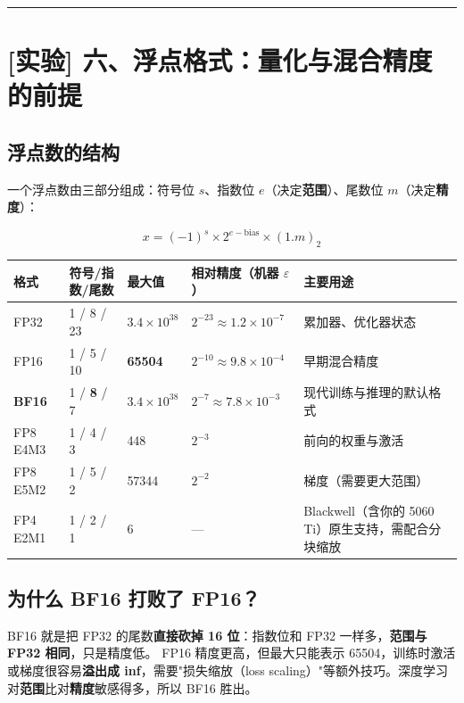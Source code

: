 \vspace{0.8em}\hrule\vspace{0.8em}

\section{[实验] 六、浮点格式：量化与混合精度的前提}

\subsection{浮点数的结构}

一个浮点数由三部分组成：符号位 $s$、指数位 $e$（决定\textbf{范围}）、尾数位 $m$（决定\textbf{精度}）：

\[
x = (-1)^s \times 2^{e - \text{bias}} \times (1.m)_2
\]

\begin{center}
\small
\begin{tabularx}{\textwidth}{l X X X X }
\toprule
\textbf{格式} & \textbf{符号/指数/尾数} & \textbf{最大值} & \textbf{相对精度（机器 $\varepsilon$）} & \textbf{主要用途} \\
\midrule
FP32 & 1 / 8 / 23 & $3.4 \times 10^{38}$ & $2^{-23} \approx 1.2 \times 10^{-7}$ & 累加器、优化器状态 \\
FP16 & 1 / 5 / 10 & \textbf{65504} & $2^{-10} \approx 9.8 \times 10^{-4}$ & 早期混合精度 \\
\textbf{BF16} & 1 / \textbf{8} / 7 & $3.4 \times 10^{38}$ & $2^{-7} \approx 7.8 \times 10^{-3}$ & 现代训练与推理的默认格式 \\
FP8 E4M3 & 1 / 4 / 3 & 448 & $2^{-3}$ & 前向的权重与激活 \\
FP8 E5M2 & 1 / 5 / 2 & 57344 & $2^{-2}$ & 梯度（需要更大范围） \\
FP4 E2M1 & 1 / 2 / 1 & 6 & — & Blackwell（含你的 5060 Ti）原生支持，需配合分块缩放 \\
\bottomrule
\end{tabularx}
\end{center}

\subsection{为什么 BF16 打败了 FP16？}

BF16 就是把 FP32 的尾数\textbf{直接砍掉 16 位}：指数位和 FP32 一样多，\textbf{范围与 FP32 相同}，只是精度低。
FP16 精度更高，但最大只能表示 65504，训练时激活或梯度很容易\textbf{溢出成 inf}，需要"损失缩放（loss scaling）"等额外技巧。深度学习对\textbf{范围}比对\textbf{精度}敏感得多，所以 BF16 胜出。

